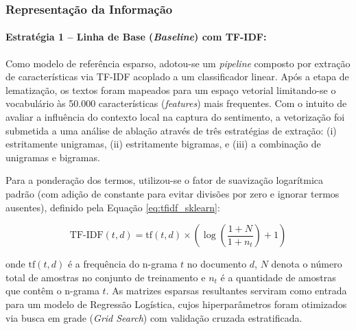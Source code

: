 \documentclass{IEEEtran}
\begin{document}
\subsubsection{Representação da Informação}
\label{subsubsec:representation}






\paragraph{Estratégia 1 -- Linha de Base (\textit{Baseline}) com TF-IDF:}
Como modelo de referência esparso, adotou-se um \textit{pipeline} composto por extração de características via TF-IDF acoplado a um classificador linear. Após a etapa de lematização, os textos foram mapeados para um espaço vetorial limitando-se o vocabulário às 50.000 características (\textit{features}) mais frequentes. Com o intuito de avaliar a influência do contexto local na captura do sentimento, a vetorização foi submetida a uma análise de ablação através de três estratégias de extração: (i) estritamente unigramas, (ii) estritamente bigramas, e (iii) a combinação de unigramas e bigramas.

Para a ponderação dos termos, utilizou-se o fator de suavização logarítmica padrão (com adição de constante para evitar divisões por zero e ignorar termos ausentes), definido pela Equação \ref{eq:tfidf_sklearn}:

\begin{equation}
  \text{TF-IDF}(t,d) = \text{tf}(t,d) \times \left( \log\!\left(\frac{1 + N}{1 + n_t}\right) + 1 \right)
  \label{eq:tfidf_sklearn}
\end{equation}

onde $\text{tf}(t,d)$ é a frequência do n-grama $t$ no documento $d$, $N$ denota o número total de amostras no conjunto de treinamento e $n_t$ é a quantidade de amostras que contêm o n-grama $t$. As matrizes esparsas resultantes serviram como entrada para um modelo de Regressão Logística, cujos hiperparâmetros foram otimizados via busca em grade (\textit{Grid Search}) com validação cruzada estratificada.
\end{document}
